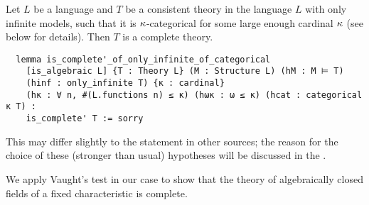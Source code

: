 \begin{prop}
  Let $L$ be a language and $T$ be a consistent theory in the language $L$
  with only infinite models, such that it is $\kappa$-categorical
  for some large enough cardinal $\kappa$ (see below for details).
  Then $T$ is a complete theory.

  \begin{lstlisting}
  lemma is_complete'_of_only_infinite_of_categorical
    [is_algebraic L] {T : Theory L} (M : Structure L) (hM : M ⊨ T)
    (hinf : only_infinite T) {κ : cardinal}
    (hκ : ∀ n, #(L.functions n) ≤ κ) (hωκ : ω ≤ κ) (hcat : categorical κ T) :
    is_complete' T := sorry
\end{lstlisting}
  This may differ slightly to the statement in other sources;
  the reason for the choice of these (stronger than usual)
  hypotheses will be discussed
  in the .
\end{prop}

We apply Vaught's test in our case to show that the theory
of algebraically closed fields of a fixed characteristic is complete.

